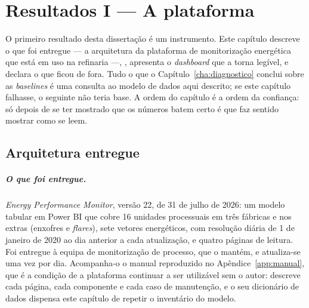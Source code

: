 
\chapter{Resultados I --- A plataforma}
\label{cha:plataforma}

O primeiro resultado desta dissertação é um instrumento. Este capítulo
descreve o que foi entregue --- a arquitetura da plataforma de
monitorização energética que está em uso na refinaria ---, , apresenta o \emph{dashboard} que a
torna legível, e declara o que ficou de fora. Tudo o que o
Capítulo~\ref{cha:diagnostico} conclui sobre as \emph{baselines} é uma
consulta ao modelo de dados aqui descrito; se este capítulo falhasse, o
seguinte não teria base. A ordem do capítulo é a ordem da confiança: só
depois de se ter mostrado que os números batem certo é que faz sentido
mostrar como se leem.

\section{Arquitetura entregue}
\label{sec:arquitetura}

\paragraph{O que foi entregue.} \emph{Energy Performance Monitor}, versão
22, de 31 de julho de 2026: um modelo tabular em Power BI que cobre 16
unidades processuais em três fábricas e nos extras (enxofres e
\emph{flares}), sete vetores energéticos, com resolução diária de 1 de
janeiro de 2020 ao dia anterior a cada atualização, e quatro páginas de
leitura. Foi entregue à equipa de monitorização de processo, que o mantém, e
atualiza-se uma vez por dia. Acompanha-o o manual reproduzido no
Apêndice~\ref{app:manual}, que é a condição de a plataforma continuar a ser
utilizável sem o autor: descreve cada página, cada componente e cada caso de
manutenção, e o seu dicionário de dados dispensa este capítulo de repetir o
inventário do modelo.

